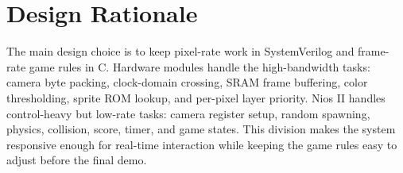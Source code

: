 \documentclass[10pt]{article}
\begin{document}
\section{Design Rationale}

The main design choice is to keep pixel-rate work in SystemVerilog and frame-rate game rules in C. Hardware modules handle the high-bandwidth tasks: camera byte packing, clock-domain crossing, SRAM frame buffering, color thresholding, sprite ROM lookup, and per-pixel layer priority. Nios II handles control-heavy but low-rate tasks: camera register setup, random spawning, physics, collision, score, timer, and game states. This division makes the system responsive enough for real-time interaction while keeping the game rules easy to adjust before the final demo.
\end{document}
